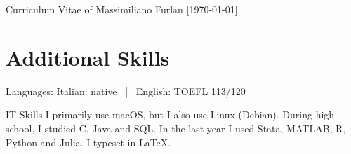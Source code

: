 \documentclass[11pt,a4paper]{article}
\begin{document}
\begin{cv}{\huge Curriculum Vitae of Massimiliano Furlan \normalsize{[\today]}}
\section{Additional Skills}
\begin{cvlist}{}
	\item[Languages:] 
		Italian: native \ | \
		English: TOEFL 113/120
	\item[IT Skills] 
		I primarily use macOS, but I also use Linux (Debian). During high school, I studied C, Java and SQL. In the last year I used Stata, MATLAB, R, Python and Julia. I typeset in \LaTeX.
\end{cvlist}


\end{cv}
\end{document}
